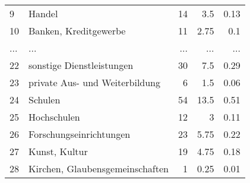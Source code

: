\begin{longtable}{lXrrr}
        9 & \multicolumn{1}{X}{Handel} & %
          \num{14} &
          \num[round-mode=places,round-precision=2]{3,5} &
          \num[round-mode=places,round-precision=2]{0,13} \\
        10 & \multicolumn{1}{X}{Banken, Kreditgewerbe} & %
          \num{11} &
          \num[round-mode=places,round-precision=2]{2,75} &
          \num[round-mode=places,round-precision=2]{0,1} \\
       ... & ... & ... & ... & ... \\
        22 & \multicolumn{1}{X}{sonstige Dienstleistungen} & %
          \num{30} &
          \num[round-mode=places,round-precision=2]{7,5} &
          \num[round-mode=places,round-precision=2]{0,29} \\

        23 & \multicolumn{1}{X}{private Aus- und Weiterbildung} & %
          \num{6} &
          \num[round-mode=places,round-precision=2]{1,5} &
          \num[round-mode=places,round-precision=2]{0,06} \\

        24 & \multicolumn{1}{X}{Schulen} & %
          \num{54} &
          \num[round-mode=places,round-precision=2]{13,5} &
          \num[round-mode=places,round-precision=2]{0,51} \\

        25 & \multicolumn{1}{X}{Hochschulen} & %
          \num{12} &
          \num[round-mode=places,round-precision=2]{3} &
          \num[round-mode=places,round-precision=2]{0,11} \\

        26 & \multicolumn{1}{X}{Forschungseinrichtungen} & %
          \num{23} &
          \num[round-mode=places,round-precision=2]{5,75} &
          \num[round-mode=places,round-precision=2]{0,22} \\

        27 & \multicolumn{1}{X}{Kunst, Kultur} & %
          \num{19} &
          \num[round-mode=places,round-precision=2]{4,75} &
          \num[round-mode=places,round-precision=2]{0,18} \\

        28 & \multicolumn{1}{X}{Kirchen, Glaubensgemeinschaften} & %
          \num{1} &
          \num[round-mode=places,round-precision=2]{0,25} &
          \num[round-mode=places,round-precision=2]{0,01} \\


\end{longtable}
